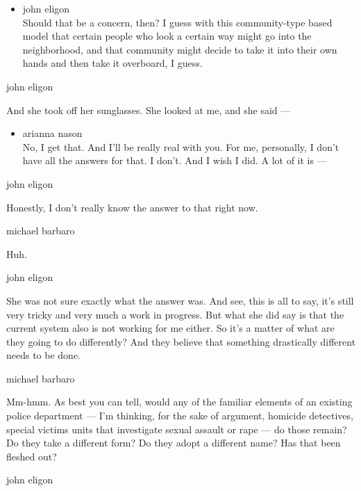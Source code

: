 \begin{itemize}
\tightlist
\item
  john eligon\\
  Should that be a concern, then? I guess with this community-type based
  model that certain people who look a certain way might go into the
  neighborhood, and that community might decide to take it into their
  own hands and then take it overboard, I guess.
\end{itemize}

john eligon

And she took off her sunglasses. She looked at me, and she said ---

\begin{itemize}
\tightlist
\item
  arianna nason\\
  No, I get that. And I'll be really real with you. For me, personally,
  I don't have all the answers for that. I don't. And I wish I did. A
  lot of it is ---
\end{itemize}

john eligon

Honestly, I don't really know the answer to that right now.

michael barbaro

Huh.

john eligon

She was not sure exactly what the answer was. And see, this is all to
say, it's still very tricky and very much a work in progress. But what
she did say is that the current system also is not working for me
either. So it's a matter of what are they going to do differently? And
they believe that something drastically different needs to be done.

michael barbaro

Mm-hmm. As best you can tell, would any of the familiar elements of an
existing police department --- I'm thinking, for the sake of argument,
homicide detectives, special victims units that investigate sexual
assault or rape --- do those remain? Do they take a different form? Do
they adopt a different name? Has that been fleshed out?

john eligon

